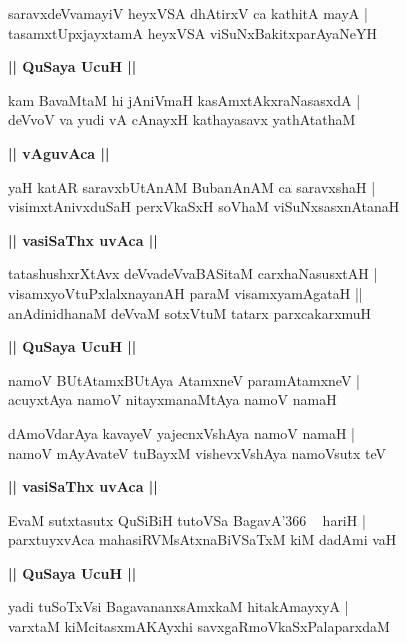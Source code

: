 \documentclass[twoside,12pt,openright]{book}
\newcounter{shloka}[chapter]
\def\uvaca#1{\centerline{{\large\textbf{#1}}}}
\begin{document}
\begin{shloka}%
saravxdeVvamayiV heyxVSA dhAtirxV ca kathitA mayA |\\
tasamxtUpxjayxtamA heyxVSA viSuNxBakitxparAyaNeYH
\end{shloka}

\uvaca{|| QuSaya UcuH ||}

\begin{shloka}%
kam BavaMtaM hi jAniVmaH kasAmxtAkxraNasasxdA |\\
deVvoV va yudi vA cAnayxH kathayasavx yathAtathaM 
\end{shloka}

\uvaca{|| vAguvAca ||}

\begin{shloka}%
yaH katAR saravxbUtAnAM BubanAnAM ca saravxshaH |\\
visimxtAnivxduSaH perxVkaSxH soVhaM viSuNxsasxnAtanaH
\end{shloka}

\uvaca{|| vasiSaThx uvAca ||}

\begin{shloka}%
tatashushxrXtAvx deVvadeVvaBASitaM carxhaNasusxtAH |\\
visamxyoVtuPxlalxnayanAH paraM visamxyamAgataH ||\\
anAdinidhanaM deVvaM sotxVtuM tatarx parxcakarxmuH
\end{shloka}

\uvaca{|| QuSaya UcuH ||}

\begin{shloka}%
namoV BUtAtamxBUtAya AtamxneV paramAtamxneV |\\
acuyxtAya namoV nitayxmanaMtAya namoV namaH 
\end{shloka}

\begin{shloka}%
dAmoVdarAya kavayeV yajecnxVshAya namoV namaH |\\
namoV mAyAvateV tuBayxM vishevxVshAya namoVsutx teV 
\end{shloka}

\uvaca{|| vasiSaThx uvAca ||}

\begin{shloka}%
EvaM sutxtasutx QuSiBiH tutoVSa BagavA\char'366 ~ hariH |\\
parxtuyxvAca mahasiRVMsAtxnaBiVSaTxM kiM dadAmi vaH 
\end{shloka}

\uvaca{|| QuSaya UcuH ||}

\begin{shloka}%
yadi tuSoTxVsi BagavananxsAmxkaM hitakAmayxyA |\\
varxtaM kiMcitasxmAKAyxhi savxgaRmoVkaSxPalaparxdaM 
\end{shloka}
\end{document}
